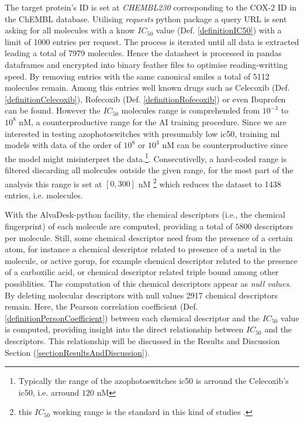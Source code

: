 \documentclass[11pt]{article}
\begin{document}
The target protein's ID is set at \emph{CHEMBL230} corresponding to the COX-2 ID in the ChEMBL database\cite{ChemblDatabase}. Utilising \emph{requests} python package\cite{PythonPackageRequests} a query URL is sent asking for all molecules with a know $IC_{50}$ value (Def. \ref{definitionIC50}) with a limit of 1000 entries per request. The process is iterated until all data is extracted leading a total of 7979 molecules. Hence the datasheet is processed in pandas dataframes\cite{PythonPackagePandas} and encrypted into binary feather files to optimise reading-writting speed. By removing entries with the same canonical smiles a total of 5112 molecules remain. Among this entries well known drugs such as Celecoxib (Def. \ref{definitionCelecoxib}), Rofecoxib (Def. \ref{definitionRofecoxib}) or even Ibuprofen can be found. However the $IC_{50}$ molecules range is comprehended from $10^{-3}$ to $10^{8}$ nM, a counterproductive range for the AI training procedure. Since we are interested in testing azophotoswitches with presumably low \gls{ic50}, training \gls{ml} models with data of the order of $10^{8}$ or $10^{3}$ nM can be counterproductive since the model might misinterpret the data.\footnote{Typically the range of the azophotoswitches \gls{ic50} is arround the Celecoxib's \gls{ic50}, i.e. arround $120$ nM}. Consecutivelly, a hard-coded range is filtered discarding all molecules outside the given range, for the most part of the analysis this range is set at $[0,300]$ nM \footnote{this $IC_{50}$ working range is the standard in this kind of studies \cite{MachineLearningPaper5Lipoxygenase}.} which reduces the dataset to 1438 entries, i.e. molecules.

With the AlvaDesk-python \cite{AlvaDescSecondPaper} facility, the chemical descriptors (i.e., the chemical fingerprint) of each molecule are computed, providing a total of $5800$ descriptors per molecule. Still, some chemical descriptor need from the presence of a certain atom, for instance a chemical descriptor related to presence of a metal in the molecule, or active gorup, for example chemical descriptor related to the presence of a carboxilic acid, or chemical descriptor related triple bound among other possiblities. The computation of this chemical descriptors appear as \emph{null values}. By deleting molecular descriptors with null values 2917 chemical descriptors remain. Here, the Pearson correlation coefficient (Def. \ref{definitionPersonCoefficient}) between each chemical descriptor and the $IC_{50}$ value is computed, providing insight into the direct relationship between $IC_{50}$ and the descriptors. This relationship will be discussed in the Results and Discussion Section (\ref{sectionResultsAndDiscussion}).
\end{document}
